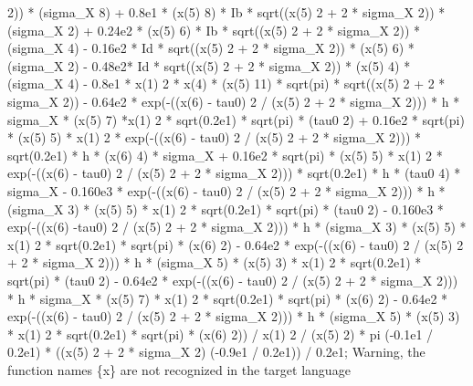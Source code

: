 \begin{maplegroup}
2)) * (sigma\_X  8) + 0.8e1 * (x(5)  8) * Ib * sqrt((x(5)  2 + 2 * sigma\_X  2)) * (sigma\_X  2) + 0.24e2 * (x(5)  6) * Ib * sqrt((x(5)  2 + 2 * sigma\_X  2)) * (sigma\_X  4) - 0.16e2 * Id * sqrt((x(5)  2 + 2 * sigma\_X  2)) * (x(5)  6) * (sigma\_X  2) - 0.48e2* Id * sqrt((x(5)  2 + 2 * sigma\_X  2)) * (x(5)  4) * (sigma\_X  4) - 0.8e1 * x(1)  2 * x(4) * (x(5)  11) * sqrt(pi) * sqrt((x(5)  2 + 2 * sigma\_X  2)) - 0.64e2 * exp(-((x(6) - tau0)  2 / (x(5)  2 + 2 * sigma\_X  2))) * h * sigma\_X * (x(5)  7) *x(1)  2 * sqrt(0.2e1) * sqrt(pi) * (tau0  2) + 0.16e2 * sqrt(pi) * (x(5)  5) * x(1)  2 * exp(-((x(6) - tau0)  2 / (x(5)  2 + 2 * sigma\_X  2))) * sqrt(0.2e1) * h * (x(6)  4) * sigma\_X + 0.16e2 * sqrt(pi) * (x(5)  5) * x(1)  2 * exp(-((x(6) - tau0)  2 / (x(5)  2 + 2 * sigma\_X  2))) * sqrt(0.2e1) * h * (tau0  4) * sigma\_X - 0.160e3 * exp(-((x(6) - tau0)  2 / (x(5)  2 + 2 * sigma\_X  2))) * h * (sigma\_X  3) * (x(5)  5) * x(1)  2 * sqrt(0.2e1) * sqrt(pi) * (tau0  2) - 0.160e3 * exp(-((x(6) -tau0)  2 / (x(5)  2 + 2 * sigma\_X  2))) * h * (sigma\_X  3) * (x(5)  5) * x(1)  2 * sqrt(0.2e1) * sqrt(pi) * (x(6)  2) - 0.64e2 * exp(-((x(6) - tau0)  2 / (x(5)  2 + 2 * sigma\_X  2))) * h * (sigma\_X  5) * (x(5)  3) * x(1)  2 * sqrt(0.2e1) * sqrt(pi) * (tau0  2) - 0.64e2 * exp(-((x(6) - tau0)  2 / (x(5)  2 + 2 * sigma\_X  2))) * h * sigma\_X * (x(5)  7) * x(1)  2 * sqrt(0.2e1) * sqrt(pi) * (x(6)  2) - 0.64e2 * exp(-((x(6) - tau0)  2 / (x(5)  2 + 2 * sigma\_X  2))) * h * (sigma\_X  5) * (x(5)  3) * x(1)  2 * sqrt(0.2e1) * sqrt(pi) * (x(6)  2)) / x(1)  2 / (x(5)  2) * pi  (-0.1e1 / 0.2e1) * ((x(5)  2 + 2 * sigma\_X  2)  (-0.9e1 / 0.2e1)) / 0.2e1;
\underline{}Warning, the function names \{x\} are not recognized in the target language\underline{}\mapleresult

\end{maplegroup}

